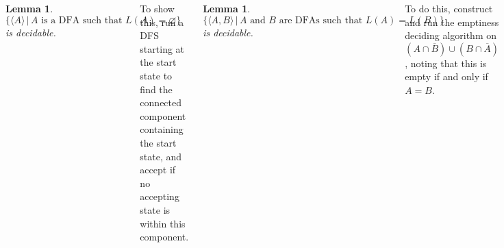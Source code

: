 \documentclass{tikzposter} %
\newtheorem{lemma}[theorem]{Lemma}
\begin{document}
\begin{columns}
{      \begin{lemma}
      \ $\{\langle A \rangle \,|\, A \text{ is a DFA such that } L(A) = \varnothing\}$ is decidable.
      \end{lemma}
      \hphantom{}

      To show this, run a DFS starting at the start state to find the connected component containing the start state, and accept if no accepting state is within this component. \\

      \begin{lemma}
      \ $\{\langle A, B \rangle \,|\, A \text{ and  } B \text{ are DFAs such that  } L(A) = L(B)\}$ is decidable.
      \end{lemma}
      \hphantom{}

      To do this, construct and run the emptiness deciding algorithm on $(A \cap \overline{B}) \cup (B \cap \overline{A})$, noting that this is empty if and only if $A = B$. \\

      \begin{lemma}
      \ $\{\langle G \rangle \,|\, G \text{ is a CFG such that } L(G) = \varnothing\}$ is decidable.
      \end{lemma}
      \hphantom{}

      To do this, mark all terminal symbols in $G$, and then from each marked symbol mark the rule creating them, and check ultimately if the start symbol is marked. If it is not, then accept, and otherwise reject. \\

      \begin{lemma}
      \ $\{\langle A, B \rangle \,|\, A \text{ and  } B \text{ are CFGs such that  } L(A) = L(B)\}$ is undecidable.
      \end{lemma}
      \hphantom{}

      }
\end{columns}
\end{document}
